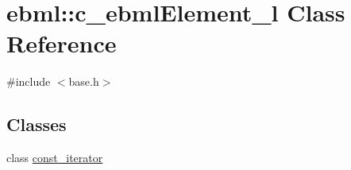 \hypertarget{classebml_1_1c__ebmlElement__l}{}\section{ebml\+:\+:c\+\_\+ebml\+Element\+\_\+l Class Reference}
\label{classebml_1_1c__ebmlElement__l}


{\ttfamily \#include $<$base.\+h$>$}

\subsection*{Classes}
\begin{DoxyCompactItemize}
\item 
class \mbox{\hyperlink{classebml_1_1c__ebmlElement__l_1_1const__iterator}{const\+\_\+iterator}}
\end{DoxyCompactItemize}

